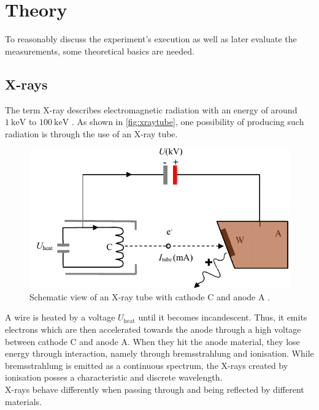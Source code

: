 \section{Theory}
\label{sec:theorie}

To reasonably discuss the experiment's execution as well as later evaluate the measurements, some theoretical basics are needed.

\subsection{X-rays}

The term X-ray describes electromagnetic radiation with an energy of around $\SI{1}{\kilo\eV}$ to $\SI{100}{\kilo\eV}$ \cite{gamma}.
As shown in \autoref{fig:xraytube}, one possibility of producing such radiation is through the use of an X-ray tube.

\begin{figure}[H]
    \centering
    \includegraphics{figures/x-ray_tube.pdf}
    \caption{Schematic view of an X-ray tube with cathode C and anode A \cite{xraytube}.}
    \label{fig:xraytube}
\end{figure}

A wire is heated by a voltage $U_\text{heat}$ until it becomes incandescent.
Thus, it emits electrons which are then accelerated towards the anode through a high voltage between cathode C and anode A.
When they hit the anode material, they lose energy through interaction, namely through bremsstrahlung and ionisation.
While bremsstrahlung is emitted as a continuous spectrum, the X-rays created by ionisation posses a characteristic and discrete wavelength. \\

X-rays behave differently when passing through and being reflected by different materials.

